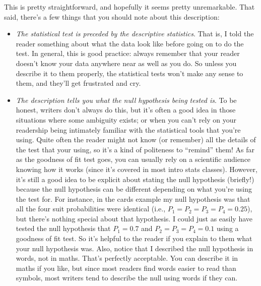 \noindent
This is pretty straightforward, and hopefully it seems pretty unremarkable. That said, there's a few things that you should note about this description:
\begin{itemize}
\item {\it The statistical test is preceded by the descriptive statistics}. That is, I told the reader something about what the data look like before going on to do the test. In general, this is good practice: always remember that your reader doesn't know your data anywhere near as well as you do. So unless you describe it to them properly, the statistical tests won't make any sense to them, and they'll get frustrated and cry.
\item {\it The description tells you what the null hypothesis being tested is}. To be honest, writers don't always do this, but it's often a good idea in those situations where some ambiguity exists; or when you can't rely on your readership being intimately familiar with the statistical tools that you're using. Quite often the reader might not know (or remember) all the details of the test that your using, so it's a kind of politeness to ``remind'' them! As far as the goodness of fit test goes, you can usually rely on a scientific audience knowing how it works (since it's covered in most intro stats classes). However, it's still a good idea to be explicit about stating the null hypothesis (briefly!) because the null hypothesis can be different depending on what you're using the test for. For instance, in the cards example my null hypothesis was that all the four suit probabilities were identical (i.e., $P_1 = P_2 = P_3 = P_4 = 0.25$), but there's nothing special about that hypothesis. I could just as easily have tested the null hypothesis that $P_1 = 0.7$ and $P_2 = P_3 = P_4 = 0.1$ using a goodness of fit test. So it's helpful to the reader if you explain to them what your null hypothesis was. Also, notice that I described the null hypothesis in words, not in maths. That's perfectly acceptable. You can describe it in maths if you like, but since most readers find words easier to read than symbols, most writers tend to describe the null using words if they can.

\end{itemize}
